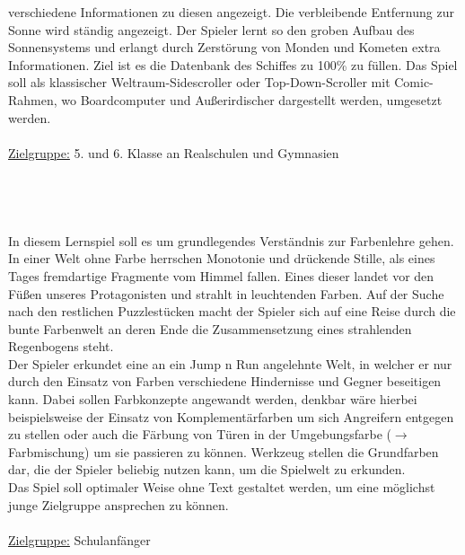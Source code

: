 \documentclass[10pt,a4paper,notitlepage]{report}
\begin{document}
	verschiedene Informationen zu diesen angezeigt. Die verbleibende Entfernung zur
	Sonne wird ständig angezeigt. Der Spieler lernt so den groben Aufbau des
	Sonnensystems und erlangt durch Zerstörung von Monden und Kometen extra
	Informationen. Ziel ist es die Datenbank des Schiffes zu 100\% zu füllen.
	Das Spiel soll als klassischer Weltraum-Sidescroller oder Top-Down-Scroller
	mit Comic-Rahmen, wo Boardcomputer und Außerirdischer dargestellt werden,
	umgesetzt werden.\\
	\\
	\underline{Zielgruppe:} 5. und 6. Klasse an Realschulen und Gymnasien\\
	\\
	\\
	\\
	\\
	\Text
		In diesem Lernspiel soll es um grundlegendes Verständnis zur Farbenlehre gehen. \\
	In einer Welt ohne Farbe herrschen Monotonie und drückende Stille, als eines Tages 
	fremdartige Fragmente vom Himmel fallen. Eines dieser landet vor den Füßen unseres 
	Protagonisten und strahlt in leuchtenden Farben. Auf der Suche nach den restlichen 
	Puzzlestücken macht der Spieler sich auf eine Reise durch die bunte Farbenwelt an 
	deren Ende die Zusammensetzung eines strahlenden Regenbogens steht.\\
		Der Spieler erkundet eine an ein Jump n Run angelehnte Welt, in welcher er nur 
	durch den Einsatz von Farben verschiedene Hindernisse und Gegner beseitigen kann. 
	Dabei sollen Farbkonzepte angewandt werden, denkbar wäre hierbei beispielsweise 
	der Einsatz von Komplementärfarben um sich Angreifern entgegen zu stellen oder 
	auch die Färbung von Türen in der Umgebungsfarbe ($\rightarrow$ Farbmischung) um sie passieren 
	zu können. Werkzeug stellen die Grundfarben dar, die der Spieler beliebig nutzen kann, 
	um die Spielwelt zu erkunden.\\
		Das Spiel soll optimaler Weise ohne Text gestaltet werden, um eine möglichst junge 
	Zielgruppe ansprechen zu können.\\
	\\
	\underline{Zielgruppe:} Schulanfänger\\
	\\
	\\
	\\
	\\
	\\
	\Fusszeile
\end{document}
